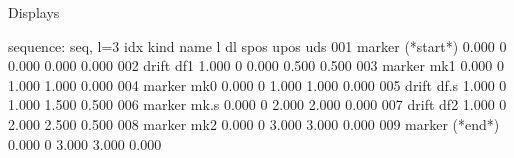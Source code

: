 \documentclass[letterpaper,10pt,english]{sphinxmanual}
\begin{document}
\begin{sphinxVerbatim}[commandchars=\\\{\}]
     
         
     
     
 
        
        
     
 
\end{sphinxVerbatim}

\sphinxAtStartPar
Displays

\begin{sphinxVerbatim}[commandchars=\\\{\}]
sequence: seq, l=3
idx  kind     name         l          dl       spos       upos    uds
001  marker   (*\PYGZdl{}start*)   0.000       0       0.000      0.000   0.000
002  drift    df1          1.000       0       0.000      0.500   0.500
003  marker   mk1          0.000       0       1.000      1.000   0.000
004  marker   mk0          0.000       0       1.000      1.000   0.000
005  drift    df.s         1.000       0       1.000      1.500   0.500
006  marker   mk.s         0.000       0       2.000      2.000   0.000
007  drift    df2          1.000       0       2.000      2.500   0.500
008  marker   mk2          0.000       0       3.000      3.000   0.000
009  marker   (*\PYGZdl{}end*)     0.000       0       3.000      3.000   0.000
\end{sphinxVerbatim}
\end{document}
